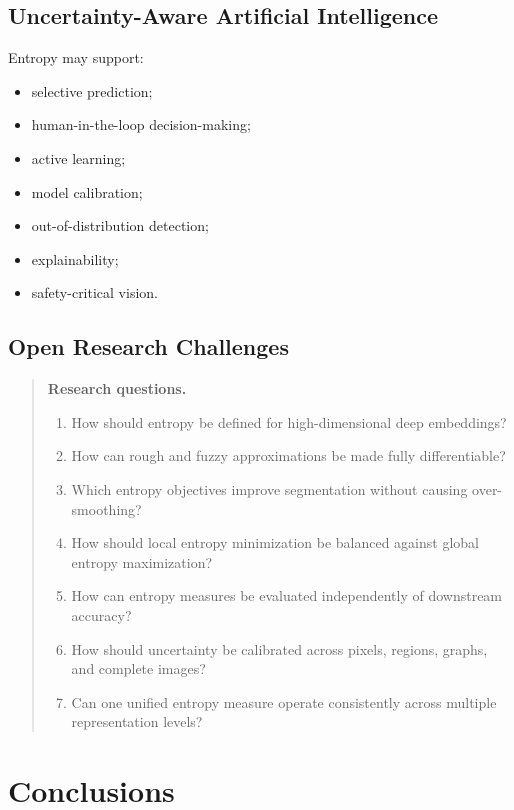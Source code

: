 \documentclass[11pt,oneside]{book}
\theoremstyle{remark}
\newenvironment{researchquestions}
{
	\begin{quote}
		\small
		\textbf{Research questions.}
		\begin{enumerate}
		}
		{
		\end{enumerate}
	\end{quote}
}
\begin{document}
	\section{Uncertainty-Aware Artificial Intelligence}
	
	Entropy may support:
	
	\begin{itemize}
		\item selective prediction;
		\item human-in-the-loop decision-making;
		\item active learning;
		\item model calibration;
		\item out-of-distribution detection;
		\item explainability;
		\item safety-critical vision.
	\end{itemize}
	
	\section{Open Research Challenges}
	
	\begin{researchquestions}
		\item How should entropy be defined for high-dimensional deep embeddings?
		\item How can rough and fuzzy approximations be made fully differentiable?
		\item Which entropy objectives improve segmentation without causing
		over-smoothing?
		\item How should local entropy minimization be balanced against global
		entropy maximization?
		\item How can entropy measures be evaluated independently of downstream
		accuracy?
		\item How should uncertainty be calibrated across pixels, regions,
		graphs, and complete images?
		\item Can one unified entropy measure operate consistently across
		multiple representation levels?
	\end{researchquestions}
	
	
	\chapter{Conclusions}
	\label{chap:conclusions}
	
\end{document}
